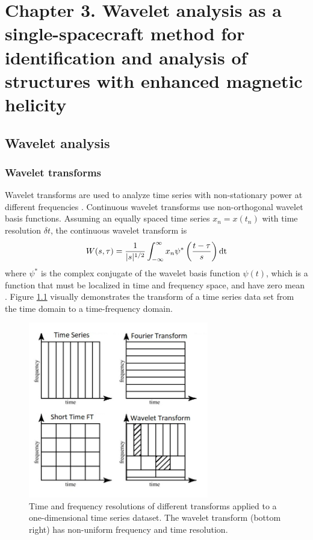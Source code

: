 \chapter{Chapter 3. Wavelet analysis as a single-spacecraft method for identification and analysis of structures with enhanced magnetic helicity}

\section{Wavelet analysis}
%

\subsection{Wavelet transforms}
Wavelet transforms are used to analyze time series with non-stationary power at different frequencies \cite{Torrence:1998}. Continuous wavelet transforms use non-orthogonal wavelet basis functions. Assuming  an equally spaced time series $x_n=x(t_n)$ with time resolution $\delta t$, the continuous wavelet transform is
\begin{equation}
    W(s,\tau) = \frac{1}{|s|^{1/2}}\int_{-\infty}^\infty x_n\psi^*\left( \frac{t-\tau}{s} \right)\textnormal{dt}
    \label{wavetrans}
\end{equation}
where $\psi^*$ is the complex conjugate of the wavelet basis function $\psi(t)$, which is a function that must be localized in time and frequency space, and have zero mean \cite{Torrence:1998}. Figure \ref{fig:wavelet-diagram} visually demonstrates the transform of a time series data set from the time domain to a time-frequency domain.

\begin{figure}
    \centering
    \includegraphics[width=0.7\textwidth]{Figures/Comparisonoftransformations.jpeg}
    \caption[Time and frequency resolutions of different transforms]{Time and frequency resolutions of different transforms applied to a one-dimensional time series dataset. The wavelet transform (bottom right) has non-uniform frequency and time resolution.}
    \label{fig:wavelet-diagram}
\end{figure}

